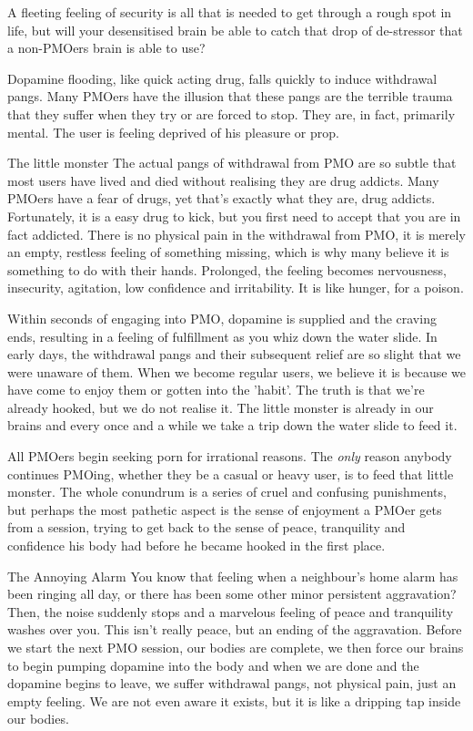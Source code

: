 
A fleeting feeling of security is all that is needed to get through a rough spot in life, but will your desensitised brain be able to catch that drop of de-stressor that a non-PMOers brain is able to use?

Dopamine flooding, like quick acting drug, falls quickly to induce withdrawal pangs. Many PMOers have the illusion that these pangs are the terrible trauma that they suffer when they try or are forced to stop. They are, in fact, primarily mental. The user is feeling deprived of his pleasure or prop.

The little monster
The actual pangs of withdrawal from PMO are so subtle that most users have lived and died without realising they are drug addicts. Many PMOers have a fear of drugs, yet that's exactly what they are, drug addicts. Fortunately, it is a easy drug to kick, but you first need to accept that you are in fact addicted. There is no physical pain in the withdrawal from PMO, it is merely an empty, restless feeling of something missing, which is why many believe it is something to do with their hands. Prolonged, the feeling becomes nervousness, insecurity, agitation, low confidence and irritability. It is like hunger, for a poison.

Within seconds of engaging into PMO, dopamine is supplied and the craving ends, resulting in a feeling of fulfillment as you whiz down the water slide. In early days, the withdrawal pangs and their subsequent relief are so slight that we were unaware of them. When we become regular users, we believe it is because we have come to enjoy them or gotten into the 'habit'. The truth is that we're already hooked, but we do not realise it. The little monster is already in our brains and every once and a while we take a trip down the water slide to feed it.

All PMOers begin seeking porn for irrational reasons. The \textit{only} reason anybody continues PMOing, whether they be a casual or heavy user, is to feed that little monster. The whole conundrum is a series of cruel and confusing punishments, but perhaps the most pathetic aspect is the sense of enjoyment a PMOer gets from a session, trying to get back to the sense of peace, tranquility and confidence his body had before he became hooked in the first place.

The Annoying Alarm
You know that feeling when a neighbour's home alarm has been ringing all day, or there has been some other minor persistent aggravation? Then, the noise suddenly stops and a marvelous feeling of peace and tranquility washes over you. This isn't really peace, but an ending of the aggravation. Before we start the next PMO session, our bodies are complete, we then force our brains to begin pumping dopamine into the body and when we are done and the dopamine begins to leave, we suffer withdrawal pangs, not physical pain, just an empty feeling. We are not even aware it exists, but it is like a dripping tap inside our bodies.

